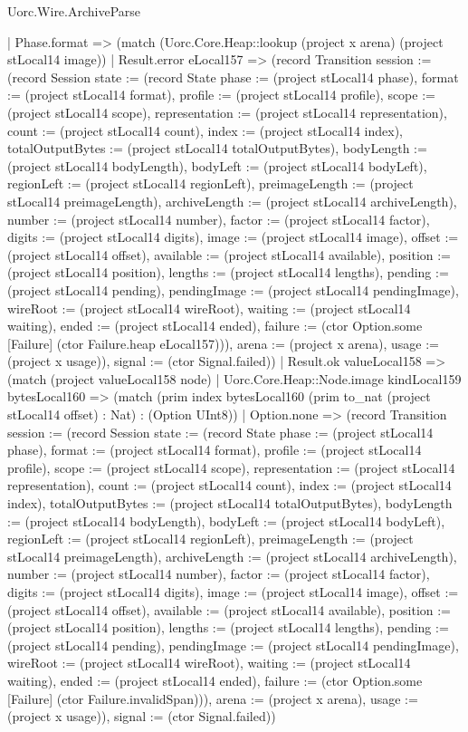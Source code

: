 \begin{lexlean}{Uorc.Wire.ArchiveParse}
\begin{semanticmodule}
{        | Phase.format => (match (Uorc.Core.Heap::lookup (project x arena) (project stLocal14 image))
          | Result.error eLocal157 => (record Transition {session := (record Session {state := (record State {phase := (project stLocal14 phase), format := (project stLocal14 format), profile := (project stLocal14 profile), scope := (project stLocal14 scope), representation := (project stLocal14 representation), count := (project stLocal14 count), index := (project stLocal14 index), totalOutputBytes := (project stLocal14 totalOutputBytes), bodyLength := (project stLocal14 bodyLength), bodyLeft := (project stLocal14 bodyLeft), regionLeft := (project stLocal14 regionLeft), preimageLength := (project stLocal14 preimageLength), archiveLength := (project stLocal14 archiveLength), number := (project stLocal14 number), factor := (project stLocal14 factor), digits := (project stLocal14 digits), image := (project stLocal14 image), offset := (project stLocal14 offset), available := (project stLocal14 available), position := (project stLocal14 position), lengths := (project stLocal14 lengths), pending := (project stLocal14 pending), pendingImage := (project stLocal14 pendingImage), wireRoot := (project stLocal14 wireRoot), waiting := (project stLocal14 waiting), ended := (project stLocal14 ended), failure := (ctor Option.some [Failure] (ctor Failure.heap eLocal157))}), arena := (project x arena), usage := (project x usage)}), signal := (ctor Signal.failed)})
          | Result.ok valueLocal158 => (match (project valueLocal158 node)
            | Uorc.Core.Heap::Node.image kindLocal159 bytesLocal160 => (match (prim index bytesLocal160 (prim to_nat (project stLocal14 offset) : Nat) : (Option UInt8))
              | Option.none => (record Transition {session := (record Session {state := (record State {phase := (project stLocal14 phase), format := (project stLocal14 format), profile := (project stLocal14 profile), scope := (project stLocal14 scope), representation := (project stLocal14 representation), count := (project stLocal14 count), index := (project stLocal14 index), totalOutputBytes := (project stLocal14 totalOutputBytes), bodyLength := (project stLocal14 bodyLength), bodyLeft := (project stLocal14 bodyLeft), regionLeft := (project stLocal14 regionLeft), preimageLength := (project stLocal14 preimageLength), archiveLength := (project stLocal14 archiveLength), number := (project stLocal14 number), factor := (project stLocal14 factor), digits := (project stLocal14 digits), image := (project stLocal14 image), offset := (project stLocal14 offset), available := (project stLocal14 available), position := (project stLocal14 position), lengths := (project stLocal14 lengths), pending := (project stLocal14 pending), pendingImage := (project stLocal14 pendingImage), wireRoot := (project stLocal14 wireRoot), waiting := (project stLocal14 waiting), ended := (project stLocal14 ended), failure := (ctor Option.some [Failure] (ctor Failure.invalidSpan))}), arena := (project x arena), usage := (project x usage)}), signal := (ctor Signal.failed)})
}
\end{semanticmodule}
\end{lexlean}

